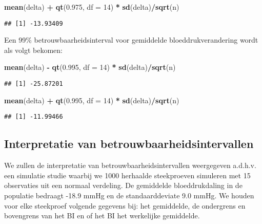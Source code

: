 \documentclass[12pt,dutch,coursenotes]{book}
\newenvironment{Shaded}{\begin{snugshade}}{\end{snugshade}}
\newcommand{\KeywordTok}[1]{\textcolor[rgb]{0.13,0.29,0.53}{\textbf{#1}}}
\newcommand{\DataTypeTok}[1]{\textcolor[rgb]{0.13,0.29,0.53}{#1}}
\newcommand{\DecValTok}[1]{\textcolor[rgb]{0.00,0.00,0.81}{#1}}
\newcommand{\FloatTok}[1]{\textcolor[rgb]{0.00,0.00,0.81}{#1}}
\newcommand{\StringTok}[1]{\textcolor[rgb]{0.31,0.60,0.02}{#1}}
\newcommand{\OperatorTok}[1]{\textcolor[rgb]{0.81,0.36,0.00}{\textbf{#1}}}
\newcommand{\NormalTok}[1]{#1}
\theoremstyle{definition}
\theoremstyle{definition}
\theoremstyle{definition}
\theoremstyle{remark}
\begin{document}
\begin{Shaded}
\begin{Highlighting}[]
\KeywordTok{mean}\NormalTok{(delta) }\OperatorTok{+}\StringTok{ }\KeywordTok{qt}\NormalTok{(}\FloatTok{0.975}\NormalTok{, }\DataTypeTok{df =} \DecValTok{14}\NormalTok{) }\OperatorTok{*}\StringTok{ }\KeywordTok{sd}\NormalTok{(delta)}\OperatorTok{/}\KeywordTok{sqrt}\NormalTok{(n)}
\end{Highlighting}
\end{Shaded}

\begin{verbatim}
## [1] -13.93409
\end{verbatim}

Een 99\% betrouwbaarheidsinterval voor gemiddelde bloeddrukverandering
wordt als volgt bekomen:

\begin{Shaded}
\begin{Highlighting}[]
\KeywordTok{mean}\NormalTok{(delta) }\OperatorTok{-}\StringTok{ }\KeywordTok{qt}\NormalTok{(}\FloatTok{0.995}\NormalTok{, }\DataTypeTok{df =} \DecValTok{14}\NormalTok{) }\OperatorTok{*}\StringTok{ }\KeywordTok{sd}\NormalTok{(delta)}\OperatorTok{/}\KeywordTok{sqrt}\NormalTok{(n)}
\end{Highlighting}
\end{Shaded}

\begin{verbatim}
## [1] -25.87201
\end{verbatim}

\begin{Shaded}
\begin{Highlighting}[]
\KeywordTok{mean}\NormalTok{(delta) }\OperatorTok{+}\StringTok{ }\KeywordTok{qt}\NormalTok{(}\FloatTok{0.995}\NormalTok{, }\DataTypeTok{df =} \DecValTok{14}\NormalTok{) }\OperatorTok{*}\StringTok{ }\KeywordTok{sd}\NormalTok{(delta)}\OperatorTok{/}\KeywordTok{sqrt}\NormalTok{(n)}
\end{Highlighting}
\end{Shaded}

\begin{verbatim}
## [1] -11.99466
\end{verbatim}

\subsection{Interpretatie van
betrouwbaarheidsintervallen}\label{subsec:interpretBI}

We zullen de interpretatie van betrouwbaarheidsintervallen weergegeven
a.d.h.v. een simulatie studie waarbij we 1000 herhaalde steekproeven
simuleren met 15 observaties uit een normaal verdeling. De gemiddelde
bloeddrukdaling in de populatie bedraagt -18.9 mmHg en de
standaarddeviate 9.0 mmHg. We houden voor elke steekproef volgende
gegevens bij: het gemiddelde, de ondergrens en bovengrens van het BI en
of het BI het werkelijke gemiddelde.
\end{document}
